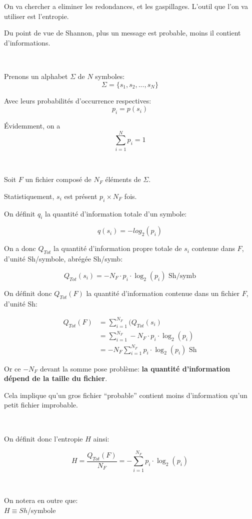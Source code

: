 \documentclass[a4paper,11pt]{article}
\newcommand{\ti}{\cdot}
\begin{document}
On va chercher a eliminer les redondances, et les gaspillages.
L'outil que l'on va utiliser est l'entropie.

Du point de vue de Shannon, plus un message est probable, moins il contient
d'informations.

\

Prenons un alphabet $\Sigma$ de $N$ symboles:
$$ \Sigma = \{s_1,s_2, ..., s_N\} $$

Avec leurs probabilités d'occurrence respectives:
$$ p_i = p(s_i) $$

Évidemment, on a
$$ \sum_{i = 1}^{N} p_i = 1$$

\

Soit $F$ un fichier composé de $N_F$ éléments de $ \Sigma $.

Statistiquement, $s_i$ est présent $p_i \times N_F$ fois.

On définit $q_i$ la quantité d'information totale d'un symbole:

$$ q(s_i) = -log_2(p_i) $$

On a donc $Q_{Tot}$ la quantité d'information propre totale de $s_i$ contenue
dans $F$, d'unité Sh/symbole, abrégée Sh/symb:

$$ Q_{Tot}(s_i) = -N_F \cdot p_i \cdot \log_2(p_i) \text{ Sh/symb}$$

On définit donc $Q_{Tot}(F)$ la quantité d'information contenue dans un fichier
$F$, d'unité Sh:

\begin{align*}
  Q_{Tot}(F) &= \sum_{i = 1}^{N_F}(Q_{Tot}(s_i) \\
             &= \sum_{i = 1}^{N_F} -N_F \ti p_i \ti \log_2(p_i) \\
             &= -N_F \sum_{i = 1}^{N_F}p_i \ti \log_2(p_i) \text{ Sh}
\end{align*}

Or ce $-N_F$ devant la somme pose problème:  \textbf{la quantité d'information
  dépend de la taille du fichier}.

Cela implique qu'un gros fichier ``probable'' contient moins d'information qu'un
petit fichier improbable.

\

On définit donc l'entropie $H$ ainsi:

$$ H = \frac{Q_{Tot}(F)}{N_F} = - \sum_{i = 1}^{N_F}p_i \ti \log_2(p_i)$$

\

On notera en outre que:\\

$ H \equiv Sh$/symbole
\end{document}
